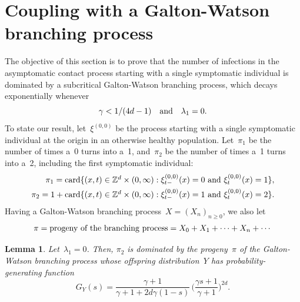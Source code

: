 \documentclass[letterpaper,11pt,twoside,keywordsasfootnote,addressatend,noinfoline]{article}
\newtheorem{lemma}[theorem]{Lemma}
\newcommand{\Z}{\mathbb{Z}}
\DeclareMathOperator{\card}{card}
\begin{document}
\section{Coupling with a Galton-Watson branching process}
\label{sec:GW}
 The objective of this section is to prove that the number of infections in the asymptomatic contact process starting with a single symptomatic individual is dominated by a subcritical Galton-Watson branching process, which decays exponentially whenever
\begin{equation}
\label{eq:assumption}
\gamma < 1 / (4d - 1) \quad \hbox{and} \quad \lambda_1 = 0.
\end{equation}
 To state our result, let~$\xi^{(0, 0)}$ be the process starting with a single symptomatic individual at the origin in an otherwise healthy population.
 Let~$\pi_1$ be the number of times a~0 turns into a~1, and~$\pi_2$ be the number of times a~1 turns into a~2, including the first symptomatic individual:
 $$ \begin{array}{r}
        \pi_1 = \card \{(x, t) \in \Z^d \times (0, \infty) : \xi_{t-}^{(0, 0)} (x) = 0 \ \hbox{and} \ \xi_t^{(0, 0)} (x) = 1 \}, \vspace*{4pt} \\
    \pi_2 = 1 + \card \{(x, t) \in \Z^d \times (0, \infty) : \xi_{t-}^{(0, 0)} (x) = 1 \ \hbox{and} \ \xi_t^{(0, 0)} (x) = 2 \}. \end{array} $$
 Having a Galton-Watson branching process~$X = (X_n)_{n \geq 0}$, we also let
 $$ \pi = \hbox{progeny of the branching process} = X_0 + X_1 + \cdots + X_n + \cdots $$
\begin{lemma}
\label{lem:offspring}
 Let~$\lambda_1 = 0$.
 Then, $\pi_2$ is dominated by the progeny~$\pi$ of the Galton-Watson branching process whose offspring distribution~$Y$ has probability-generating function
 $$ G_Y (s) = \frac{\gamma + 1}{\gamma + 1 + 2d \gamma (1 - s)} \,\bigg(\frac{\gamma s + 1}{\gamma + 1} \bigg)^{2d}.  $$
\end{lemma}
\end{document}
